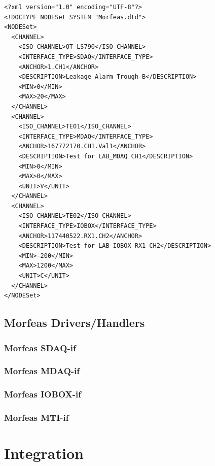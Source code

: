 \documentclass{article}
\begin{document}
\newpage
\begin{lstlisting}[frame=single,caption=Example of OPC\_UA\_Config.xml,label=lst:OPC_UA_Config.xml]
<?xml version="1.0" encoding="UTF-8"?>
<!DOCTYPE NODESet SYSTEM "Morfeas.dtd">
<NODESet>
  <CHANNEL>
    <ISO_CHANNEL>OT_LS790</ISO_CHANNEL>
    <INTERFACE_TYPE>SDAQ</INTERFACE_TYPE>
    <ANCHOR>1.CH1</ANCHOR>
    <DESCRIPTION>Leakage Alarm Trough B</DESCRIPTION>
    <MIN>0</MIN>
    <MAX>20</MAX>
  </CHANNEL>
  <CHANNEL>
    <ISO_CHANNEL>TE01</ISO_CHANNEL>
    <INTERFACE_TYPE>MDAQ</INTERFACE_TYPE>
    <ANCHOR>167772170.CH1.Val1</ANCHOR>
    <DESCRIPTION>Test for LAB_MDAQ CH1</DESCRIPTION>
    <MIN>0</MIN>
    <MAX>0</MAX>
    <UNIT>V</UNIT>
  </CHANNEL>
  <CHANNEL>
    <ISO_CHANNEL>TE02</ISO_CHANNEL>
    <INTERFACE_TYPE>IOBOX</INTERFACE_TYPE>
    <ANCHOR>117440522.RX1.CH2</ANCHOR>
    <DESCRIPTION>Test for LAB_IOBOX RX1 CH2</DESCRIPTION>
    <MIN>-200</MIN>
    <MAX>1200</MAX>
    <UNIT>C</UNIT>
  </CHANNEL>
</NODESet>
\end{lstlisting}

\subsection{Morfeas Drivers/Handlers}

\subsubsection{Morfeas SDAQ-if}
\subsubsection{Morfeas MDAQ-if}
\subsubsection{Morfeas IOBOX-if}
\subsubsection{Morfeas MTI-if}
\section{Integration}
\end{document}
